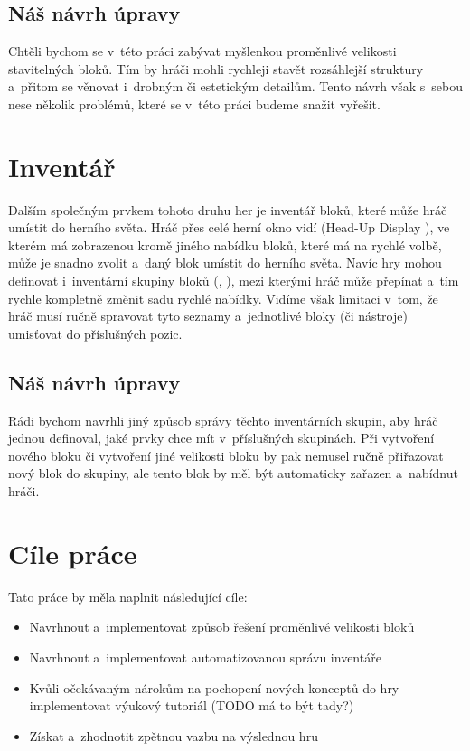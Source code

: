 \subsection{Náš návrh úpravy}
Chtěli bychom se v~této práci zabývat myšlenkou proměnlivé velikosti stavitelných bloků. Tím by hráči mohli rychleji stavět rozsáhlejší struktury a~přitom se věnovat i~drobným či estetickým detailům. Tento návrh však s~sebou nese několik problémů, které se v~této práci budeme snažit vyřešit.


\section{Inventář}
Dalším společným prvkem tohoto druhu her je inventář bloků, které může hráč umístit do herního světa. Hráč přes celé herní okno vidí \HUD{} (Head-Up Display \citep{hud_terminology}), ve kterém má zobrazenou kromě jiného nabídku bloků, které má na rychlé volbě, může je snadno zvolit a~daný blok umístit do herního světa. Navíc hry mohou definovat i~inventární skupiny bloků (\SE{}, \ME{}), mezi kterými hráč může přepínat a~tím rychle kompletně změnit sadu rychlé nabídky. Vidíme však limitaci v~tom, že hráč musí ručně spravovat tyto seznamy a~jednotlivé bloky (či nástroje) umisťovat do příslušných pozic.


\subsection{Náš návrh úpravy}
Rádi bychom navrhli jiný způsob správy těchto inventárních skupin, aby hráč jednou definoval, jaké prvky chce mít v~příslušných skupinách. Při vytvoření nového bloku či vytvoření jiné velikosti bloku by pak nemusel ručně přiřazovat nový blok do skupiny, ale tento blok by měl být automaticky zařazen a~nabídnut hráči.  




\section{Cíle práce}
Tato práce by měla naplnit následující cíle:
\begin{itemize}
	\item Navrhnout a~implementovat způsob řešení proměnlivé velikosti bloků
	\item Navrhnout a~implementovat automatizovanou správu inventáře
	\item Kvůli očekávaným nárokům na pochopení nových konceptů do hry implementovat výukový tutoriál (TODO má to být tady?)
	\item Získat a~zhodnotit zpětnou vazbu na výslednou hru
\end{itemize}

